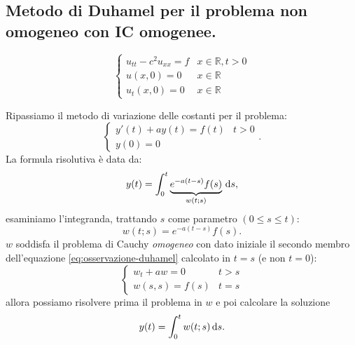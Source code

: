 \subsection{Metodo di Duhamel per il problema non omogeneo con IC omogenee.}
\begin{equation}
    \begin{cases}
        u_{tt} -c^{2} u_{xx} =f & x\in \mathbb{R} ,t >0 \\
        u(x,0) =0               & x\in \mathbb{R}       \\
        u_{t}(x,0) =0           & x\in \mathbb{R}
    \end{cases}
\end{equation}
\begin{oss}
    Ripassiamo il metodo di variazione delle costanti per il problema:
    \begin{equation*}
        \begin{cases}
            y'(t) +ay(t) =f(t) & t >0 \\
            y(0) =0            &
        \end{cases} .
    \end{equation*}
    La formula risolutiva è data da:
    \begin{equation*}
        y(t) =\int _{0}^{t}\underbrace{e^{-a(t-s)} f(s)}_{w(t;s)} \,\mathrm d s,
    \end{equation*}
    esaminiamo l'integranda, trattando $s$ come parametro $\displaystyle (0\leq s\leq t)$:
    \begin{equation}
        w(t;s) =e^{-a(t-s)} f(s) .
        \label{eq:osservazione-duhamel}
    \end{equation}
    $w$ soddisfa il problema di Cauchy \textit{omogeneo} con dato iniziale il secondo membro dell'equazione \eqref{eq:osservazione-duhamel} calcolato in $t=s$ (e non $t=0$):
    \begin{equation*}
        \begin{cases}
            w_{t} +aw=0  & t >s \\
            w(s,s) =f(s) & t=s
        \end{cases}
    \end{equation*}
    allora possiamo risolvere prima il problema in $w$ e poi calcolare la soluzione
    \begin{equation*}
        y(t) =\int _{0}^{t} w(t;s) \,\mathrm d s.
    \end{equation*}
\end{oss}

